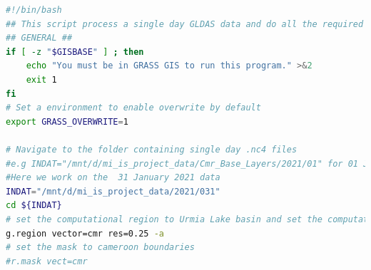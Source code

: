 \begin{lstlisting}[language=Bash]
#!/bin/bash
## This script process a single day GLDAS data and do all the required conversions needed for our project.
## GENERAL ##
if [ -z "$GISBASE" ] ; then
    echo "You must be in GRASS GIS to run this program." >&2
    exit 1
fi
# Set a environment to enable overwrite by default
export GRASS_OVERWRITE=1

# Navigate to the folder containing single day .nc4 files
#e.g INDAT="/mnt/d/mi_is_project_data/Cmr_Base_Layers/2021/01" for 01 January 2021
#Here we work on the  31 January 2021 data
INDAT="/mnt/d/mi_is_project_data/2021/031" 
cd ${INDAT}
# set the computational region to Urmia Lake basin and set the computational resolution to 0.25 degrees
g.region vector=cmr res=0.25 -a
# set the mask to cameroon boundaries
#r.mask vect=cmr


\end{lstlisting}

